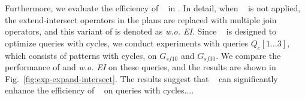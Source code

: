 Furthermore, we evaluate the efficiency of \expandintersectrule~ in \relgo. 
In detail, when \expandintersectrule~ is not applied, the extend-intersect operators in the plans are replaced with multiple join operators, and this variant of \relgo is denoted as \textit{\relgo w.o. EI}.
Since \expandintersectrule~ is designed to optimize queries with cycles, we conduct experiments with queries $Q_c[1\ldots 3]$, which consists of patterns with cycles, on $G_{sf10}$ and $G_{sf30}$.
We compare the performance of \relgo and \textit{\relgo w.o. EI} on these queries, and the results are shown in Fig.~\ref{fig:exp-expand-intersect}.
The results suggest that \expandintersectrule~ can significantly enhance the efficiency of \relgo~ on queries with cycles....





